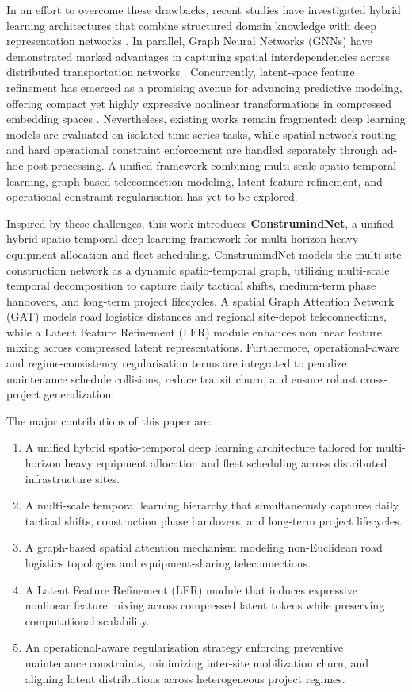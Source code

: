 \documentclass[pdflatex,sn-mathphys,Numbered]{sn-jnl}%
\begin{document}
In an effort to overcome these drawbacks, recent studies have investigated hybrid learning architectures that combine structured domain knowledge with deep representation networks \cite{meng2025,wang2025}. In parallel, Graph Neural Networks (GNNs) have demonstrated marked advantages in capturing spatial interdependencies across distributed transportation networks \cite{hussain2023,shin2023}. Concurrently, latent-space feature refinement has emerged as a promising avenue for advancing predictive modeling, offering compact yet highly expressive nonlinear transformations in compressed embedding spaces \cite{li2025,liu2025}. Nevertheless, existing works remain fragmented: deep learning models are evaluated on isolated time-series tasks, while spatial network routing and hard operational constraint enforcement are handled separately through ad-hoc post-processing. A unified framework combining multi-scale spatio-temporal learning, graph-based teleconnection modeling, latent feature refinement, and operational constraint regularisation has yet to be explored.

Inspired by these challenges, this work introduces \textbf{ConstrumindNet}, a unified hybrid spatio-temporal deep learning framework for multi-horizon heavy equipment allocation and fleet scheduling. ConstrumindNet models the multi-site construction network as a dynamic spatio-temporal graph, utilizing multi-scale temporal decomposition to capture daily tactical shifts, medium-term phase handovers, and long-term project lifecycles. A spatial Graph Attention Network (GAT) models road logistics distances and regional site-depot teleconnections, while a Latent Feature Refinement (LFR) module enhances nonlinear feature mixing across compressed latent representations. Furthermore, operational-aware and regime-consistency regularisation terms are integrated to penalize maintenance schedule collisions, reduce transit churn, and ensure robust cross-project generalization.

The major contributions of this paper are:
\begin{enumerate}
\item A unified hybrid spatio-temporal deep learning architecture tailored for multi-horizon heavy equipment allocation and fleet scheduling across distributed infrastructure sites.
\item A multi-scale temporal learning hierarchy that simultaneously captures daily tactical shifts, construction phase handovers, and long-term project lifecycles.
\item A graph-based spatial attention mechanism modeling non-Euclidean road logistics topologies and equipment-sharing teleconnections.
\item A Latent Feature Refinement (LFR) module that induces expressive nonlinear feature mixing across compressed latent tokens while preserving computational scalability.
\item An operational-aware regularisation strategy enforcing preventive maintenance constraints, minimizing inter-site mobilization churn, and aligning latent distributions across heterogeneous project regimes.
\end{enumerate}
\end{document}
